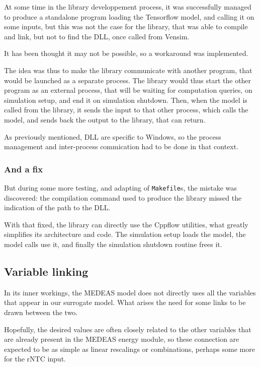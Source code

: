 At some time in the library developpement process, it was successfully managed to produce a standalone program loading the Tensorflow model, and calling it on some inputs, but this was not the case for the library, that was able to compile and link, but not to find the DLL, once called from Vensim.

It has been thought it may not be possible, so a workaround was implemented.

The idea was thus to make the library communicate with another program, that would be launched as a separate process. The library would thus start the other program as an external process, that will be waiting for computation queries, on simulation setup, and end it on simulation shutdown. Then, when the model is called from the library, it sends the input to that other process, which calls the model, and sends back the output to the library, that can return.

As previously mentioned, DLL are specific to Windows, so the process management and inter-process commication had to be done in that context.

\subsubsection{And a fix}

But during some more testing, and adapting of \texttt{Makefile}s, the mistake was discovered: the compilation command used to produce the library missed the indication of the path to the DLL.

With that fixed, the library can directly use the Cppflow utilities, what greatly simplifies its architecture and code. The simulation setup loads the model, the model calls use it, and finally the simulation shutdown routine frees it.

\subsection{Variable linking}

In its inner workings, the MEDEAS model does not directly uses all the variables that appear in our surrogate model. What arises the need for some links to be drawn between the two.

Hopefully, the desired values are often closely related to the other variables that are already present in the MEDEAS energy module, so these connection are expected to be as simple as linear rescalings or combinations, perhaps some more for the rNTC input.

